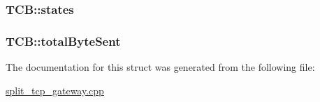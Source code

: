 \hypertarget{structTCB_ad1aaeb7bb5c5b2fa3f25c5f229cc00ba}{
\subsubsection[{states}]{ {\bf \-T\-C\-B\-::states}}}\label{structTCB_ad1aaeb7bb5c5b2fa3f25c5f229cc00ba}
\hypertarget{structTCB_ace3d5821cde5daf93774f0a377d82383}{
\subsubsection[{total\-Byte\-Sent}]{ {\bf \-T\-C\-B\-::total\-Byte\-Sent}}}\label{structTCB_ace3d5821cde5daf93774f0a377d82383}


\-The documentation for this struct was generated from the following file\-:\begin{DoxyCompactItemize}
\item 
\hyperlink{split__tcp__gateway_8cpp}{split\-\_\-tcp\-\_\-gateway.\-cpp}\end{DoxyCompactItemize}
